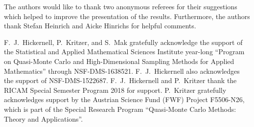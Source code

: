 \documentclass[USenglish]{article}
\theoremstyle{dgthm}
\theoremstyle{dgthm}
\theoremstyle{dgthm}
\theoremstyle{dgthm}
\theoremstyle{dgdef}
\theoremstyle{definition}
\begin{document}
\begin{acknowledgement}
The authors would like to thank two anonymous referees for their suggestions which helped to improve the presentation of the results. Furthermore, the authors thank 
Stefan Heinrich and Aicke Hinrichs for helpful comments.

F.~J.~Hickernell, P.~Kritzer, and S.~Mak gratefully acknowledge the support of the Statistical and Applied Mathematical Sciences Institute year-long ``Program on Quasi-Monte Carlo and High-Dimensional Sampling Methods for Applied Mathematics'' through NSF-DMS-1638521.  F.~J.~Hickernell also acknowledges the support of NSF-DMS-1522687.
F.~J.~Hickernell and P.~Kritzer thank the RICAM Special Semester Program 2018 for support. P.~Kritzer gratefully acknowledges support by the Austrian Science Fund (FWF) Project  F5506-N26, which is part of the Special Research Program ``Quasi-Monte Carlo Methods: Theory and Applications''.
\end{acknowledgement}





\end{document}
